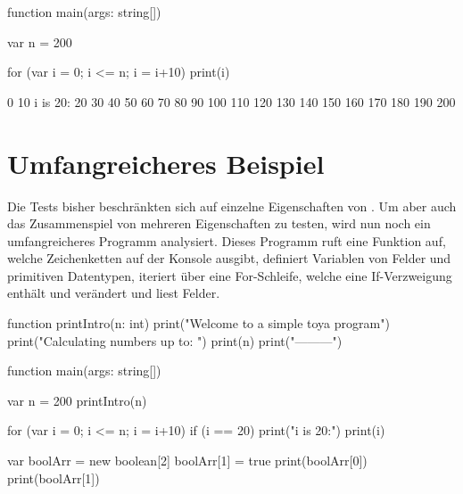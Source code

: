 \begin{ToyaCode}[numbers=none, caption={For-Schleifen}]
function main(args: string[]) {
    var n = 200

    for (var i = 0; i <= n; i = i+10) {
        print(i)
    }
}
\end{ToyaCode}


\begin{ToyaCode}[numbers=none, caption={Konsolen-Ausgabe der For-Schleife}]
0
10
i is 20:
20
30
40
50
60
70
80
90
100
110
120
130
140
150
160
170
180
190
200
\end{ToyaCode}

\section{Umfangreicheres Beispiel}
Die Tests bisher beschränkten sich auf einzelne Eigenschaften von \toya. Um aber auch das Zusammenspiel von mehreren Eigenschaften zu testen, wird nun noch ein umfangreicheres Programm analysiert. Dieses Programm ruft eine Funktion auf, welche Zeichenketten auf der Konsole ausgibt, definiert Variablen von Felder und primitiven Datentypen, iteriert über eine For-Schleife, welche eine If-Verzweigung enthält und verändert und liest Felder.

\begin{ToyaCode}[numbers=none, caption={Quelltext des umfangereicheren Beispiels}]
function printIntro(n: int) {
    print("Welcome to a simple toya program")
    print("Calculating numbers up to: ")
    print(n)
    print("---------")
}

function main(args: string[]) {
    var n = 200
    printIntro(n)

    for (var i = 0; i <= n; i = i+10) {
        if (i == 20) {
            print("i is 20:")
        }
        print(i)
    }

    var boolArr = new boolean[2]
    boolArr[1] = true
    print(boolArr[0])
    print(boolArr[1])
}
\end{ToyaCode}

